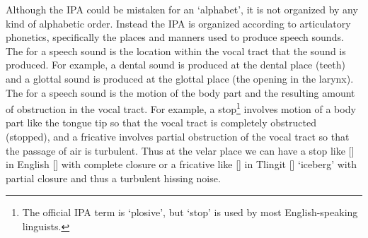 Although the IPA could be mistaken for an ‘alphabet’, it is not organized by any kind of alphabetic order.
Instead the IPA is organized according to articulatory phonetics, specifically the places and manners used to produce speech sounds.
The  for a speech sound is the location within the vocal tract that the sound is produced.
For example, a dental sound is produced at the dental place (teeth) and a glottal sound is produced at the glottal place (the opening in the larynx).
The  for a speech sound is the motion of the body part and the resulting amount of obstruction in the vocal tract.
For example, a stop\footnote{The official IPA term is ‘plosive’, but ‘stop’ is used by most English-speaking linguists.} involves motion of a body part like the tongue tip so that the vocal tract is completely obstructed (stopped), and a fricative involves partial obstruction of the vocal tract so that the passage of air is turbulent.
Thus at the velar place we can have a stop like [] in English  [] with complete closure or a fricative like [] in Tlingit  [] ‘iceberg’ with partial closure and thus a turbulent hissing noise.

